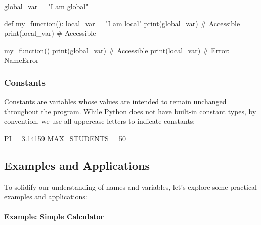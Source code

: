 \documentclass[
  letterpaper,
  DIV=11,
  numbers=noendperiod]{scrreprt}
\let\oldparagraph\paragraph
\renewcommand{\paragraph}[1]{\oldparagraph{#1}\mbox{}}
\newenvironment{Shaded}{\begin{snugshade}}{\end{snugshade}}
\newcommand{\BuiltInTok}[1]{\textcolor[rgb]{0.00,0.23,0.31}{#1}}
\newcommand{\CommentTok}[1]{\textcolor[rgb]{0.37,0.37,0.37}{#1}}
\newcommand{\DecValTok}[1]{\textcolor[rgb]{0.68,0.00,0.00}{#1}}
\newcommand{\FloatTok}[1]{\textcolor[rgb]{0.68,0.00,0.00}{#1}}
\newcommand{\KeywordTok}[1]{\textcolor[rgb]{0.00,0.23,0.31}{#1}}
\newcommand{\NormalTok}[1]{\textcolor[rgb]{0.00,0.23,0.31}{#1}}
\newcommand{\OperatorTok}[1]{\textcolor[rgb]{0.37,0.37,0.37}{#1}}
\newcommand{\StringTok}[1]{\textcolor[rgb]{0.13,0.47,0.30}{#1}}
\begin{document}
\begin{Shaded}
\begin{Highlighting}[]
\NormalTok{global\_var }\OperatorTok{=} \StringTok{"I am global"}

\KeywordTok{def}\NormalTok{ my\_function():}
\NormalTok{    local\_var }\OperatorTok{=} \StringTok{"I am local"}
    \BuiltInTok{print}\NormalTok{(global\_var)  }\CommentTok{\# Accessible}
    \BuiltInTok{print}\NormalTok{(local\_var)  }\CommentTok{\# Accessible}

\NormalTok{my\_function()}
\BuiltInTok{print}\NormalTok{(global\_var)  }\CommentTok{\# Accessible}
\BuiltInTok{print}\NormalTok{(local\_var)  }\CommentTok{\# Error: NameError}
\end{Highlighting}
\end{Shaded}

\hypertarget{constants}{%
\subsubsection{Constants}\label{constants}}

Constants are variables whose values are intended to remain unchanged
throughout the program. While Python does not have built-in constant
types, by convention, we use all uppercase letters to indicate
constants:

\begin{Shaded}
\begin{Highlighting}[]
\NormalTok{PI }\OperatorTok{=} \FloatTok{3.14159}
\NormalTok{MAX\_STUDENTS }\OperatorTok{=} \DecValTok{50}
\end{Highlighting}
\end{Shaded}

\hypertarget{examples-and-applications}{%
\subsection{Examples and Applications}\label{examples-and-applications}}

To solidify our understanding of names and variables, let's explore some
practical examples and applications:

\hypertarget{example-simple-calculator}{%
\paragraph{Example: Simple Calculator}\label{example-simple-calculator}}
\end{document}
